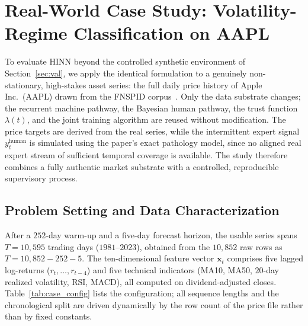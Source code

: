 %
%

\section{Real-World Case Study: Volatility-Regime Classification on AAPL}
\label{sec:case_aapl}

To evaluate HINN beyond the controlled synthetic environment of
Section~\ref{sec:val}, we apply the identical formulation to a genuinely
non-stationary, high-stakes asset series: the full daily price history of
Apple Inc.\ (AAPL) drawn from the FNSPID corpus~\cite{dong2024fnspid}. Only the
data substrate changes; the recurrent machine pathway, the Bayesian human
pathway, the trust function $\lambda(t)$, and the joint training algorithm are
reused without modification. The price targets are derived from the real series,
while the intermittent expert signal $y_t^{\mathrm{human}}$ is simulated using
the paper's exact pathology model, since no aligned real expert stream of
sufficient temporal coverage is available. The study therefore combines a
fully authentic market substrate with a controlled, reproducible supervisory
process.

\subsection{Problem Setting and Data Characterization}
\label{sec:case_problem}

After a $252$-day warm-up and a five-day forecast horizon, the usable series
spans $T = 10{,}595$ trading days ($1981$--$2023$), obtained from the
$10{,}852$ raw rows as $T = 10{,}852 - 252 - 5$. The ten-dimensional feature
vector $\bm{x}_t$ comprises five lagged log-returns
($r_{t},\dots,r_{t-4}$) and five technical indicators (MA10, MA50, $20$-day
realized volatility, RSI, MACD), all computed on dividend-adjusted closes.
Table~\ref{tab:case_config} lists the configuration; all sequence lengths and
the chronological split are driven dynamically by the row count of the price
file rather than by fixed constants.

